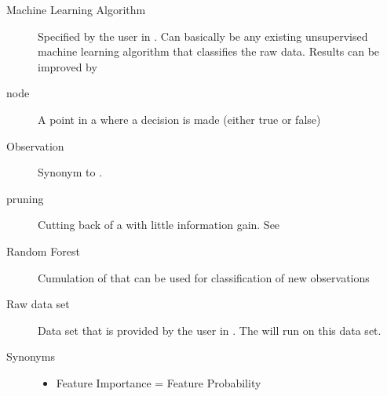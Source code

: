\documentclass[letterpaper,10pt,english]{sphinxmanual}
\begin{document}
\begin{description}
\item[{Machine Learning Algorithm}] \leavevmode{}\label{\detokenize{Overview:term-machine-learning-algorithm}}
Specified by the user in {\hyperref[\detokenize{Generate_Database:compute}]{}}.
Can basically be any existing unsupervised machine learning algorithm that classifies the raw data.
Results can be improved by {\hyperref[\detokenize{Overview:term-forestfire}]{}}

\item[{node}] \leavevmode{}\label{\detokenize{Overview:term-node}}
A point in a {\hyperref[\detokenize{Overview:term-decision-tree}]{}} where a decision is made (either true or false)

\item[{Observation}] \leavevmode{}\label{\detokenize{Overview:term-observation}}
Synonym to {\hyperref[\detokenize{Overview:term-feature-set}]{}}.

\item[{pruning}] \leavevmode{}\label{\detokenize{Overview:term-pruning}}
Cutting back {\hyperref[\detokenize{Overview:term-branch}]{}} of a {\hyperref[\detokenize{Overview:term-decision-tree}]{}} with little information gain.
See {\hyperref[\detokenize{DT:prune}]{}}

\item[{Random Forest}] \leavevmode{}\label{\detokenize{Overview:term-random-forest}}
Cumulation of {\hyperref[\detokenize{Overview:term-decision-tree}]{}} that can be used for classification of new observations

\item[{Raw data set}] \leavevmode{}\label{\detokenize{Overview:term-raw-data-set}}
Data set that is provided by the user in {\hyperref[\detokenize{Importing_Data:import-data}]{}}.
The {\hyperref[\detokenize{Overview:mla}]{}} will run on this data set.

\item[{Synonyms}] \leavevmode{}\label{\detokenize{Overview:term-synonyms}}\begin{itemize}
\item {} 
Feature Importance = Feature Probability

\end{itemize}

\end{description}
\end{document}
